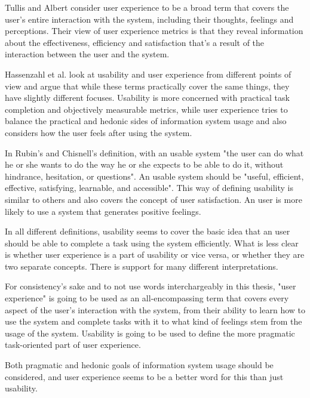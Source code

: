 \cite{bevan2009difference, bevaniso, bevanevaluation, bevanstandard}

Tullis and Albert consider user experience to be a broad term that covers the user's entire interaction with the system, including their thoughts, feelings and perceptions. Their view of user experience metrics is that they reveal information about the effectiveness, efficiency and satisfaction that's a result of the interaction between the user and the system. \cite{albert2013measuring}

Hassenzahl et al. look at usability and user experience from different points of view and argue that while these terms practically cover the same things, they have slightly different focuses. Usability is more concerned with practical task completion and objectively measurable metrics, while user experience tries to balance the practical and hedonic sides of information system usage and also considers how the user feels after using the system.
\cite{hassenzahl2006user}

In Rubin's and Chisnell's definition, with an usable system "the user can do what he or she wants to do the way he or she expects to be able to do it, without hindrance, hesitation, or questions". An usable system should be "useful, efficient, effective, satisfying, learnable, and accessible". \cite{rubin2008handbook} This way of defining usability is similar to others and also covers the concept of user satisfaction. An user is more likely to use a system that generates positive feelings.

In all different definitions, usability seems to cover the basic idea that an user should be able to complete a task using the system efficiently. What is less clear is whether user experience is a part of usability or vice versa, or whether they are two separate concepts. There is support for many different interpretations.

For consistency's sake and  to not use words interchargeably in this thesis, "user experience" is going to be used as an all-encompassing term that covers every aspect of the user's interaction with the system, from their ability to learn how to use the system and complete tasks with it to what kind of feelings stem from the usage of the system. Usability is going to be used to define the more pragmatic task-oriented part of user experience.

Both pragmatic and hedonic goals of information system usage should be considered, and user experience seems to be a better word for this than just usability.

